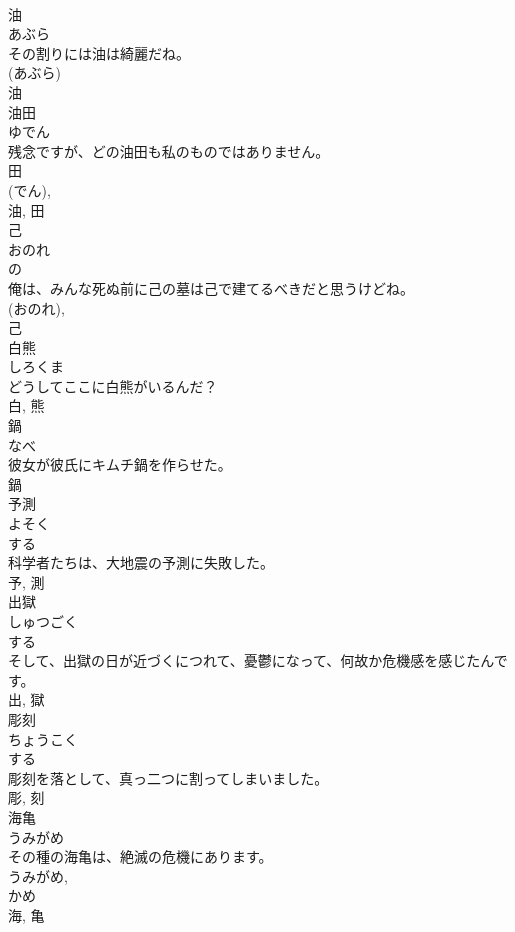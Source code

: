 \documentclass[8pt]{extreport}
\begin{document}
\begin{CJK}{UTF8}{min}
\\	油	
\\	あぶら	
\\	その割りには油は綺麗だね。	
\\	(あぶら) 
\\	油	
\\	油田	
\\	ゆでん	
\\	残念ですが、どの油田も私のものではありません。	
\\	田 
\\	(でん), 
\\	油, 田	
\\	己	
\\	おのれ	
\\	の 
\\	俺は、みんな死ぬ前に己の墓は己で建てるべきだと思うけどね。	
\\	(おのれ), 
\\	己	
\\	白熊	
\\	しろくま	
\\	どうしてここに白熊がいるんだ？	
\\	白, 熊	
\\	鍋	
\\	なべ	
\\	彼女が彼氏にキムチ鍋を作らせた。	
\\	鍋	
\\	予測	
\\	よそく	
\\	する 
\\	科学者たちは、大地震の予測に失敗した。	
\\	予, 測	
\\	出獄	
\\	しゅつごく	
\\	する 
\\	そして、出獄の日が近づくにつれて、憂鬱になって、何故か危機感を感じたんです。	
\\	出, 獄	
\\	彫刻	
\\	ちょうこく	
\\	する 
\\	彫刻を落として、真っ二つに割ってしまいました。	
\\	彫, 刻	
\\	海亀	
\\	うみがめ	
\\	その種の海亀は、絶滅の危機にあります。	
\\	うみがめ, 
\\	かめ 
\\	海, 亀	

\end{CJK}
\end{document}
